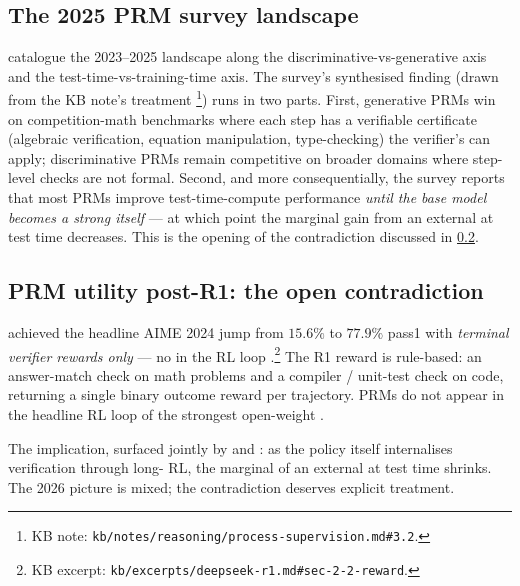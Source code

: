 \subsection{The 2025 PRM survey landscape}
\label{sec:prm-survey}

\citet{zheng2025-prm-survey} catalogue the 2023--2025  landscape
along the discriminative-vs-generative axis and the
test-time-vs-training-time axis. The survey's
synthesised finding (drawn from the KB note's
treatment%
\footnote{KB note: \texttt{kb/notes/reasoning/process-supervision.md\#3.2}.})
runs in two parts. First, generative PRMs win on competition-math
benchmarks where each step has a verifiable certificate
(algebraic verification, equation manipulation, type-checking) the
verifier's  can apply; discriminative PRMs remain competitive on
broader domains where step-level checks are not formal. Second, and
more consequentially, the survey reports that most PRMs improve
test-time-compute performance \emph{until the base model becomes a
strong  itself} — at which point the marginal gain
from an external  at test time decreases. This is the opening of
the contradiction discussed in \cref{sec:prm-post-r1}.

\subsection{PRM utility post-R1: the open contradiction}
\label{sec:prm-post-r1}

\citet{deepseek-r1} achieved the headline AIME 2024 jump from
$15.6\%$ to $77.9\%$ pass\@1 with \emph{terminal verifier rewards
only} — no  in the RL loop \citep[\S 2.2]{deepseek-r1}.\footnote{KB
excerpt: \texttt{kb/excerpts/deepseek-r1.md\#sec-2-2-reward}.} The
R1 reward is rule-based: an answer-match check on math problems and a
compiler / unit-test check on code, returning a single binary outcome
reward per trajectory. PRMs do not appear in the headline RL loop of
the strongest open-weight .

The implication, surfaced jointly by \citet{thinkprm2025} and
\citet{zheng2025-prm-survey}: as the policy itself internalises
verification through long- RL, the marginal  of an external
 at test time shrinks. The 2026 picture is mixed; the contradiction
deserves explicit treatment.


